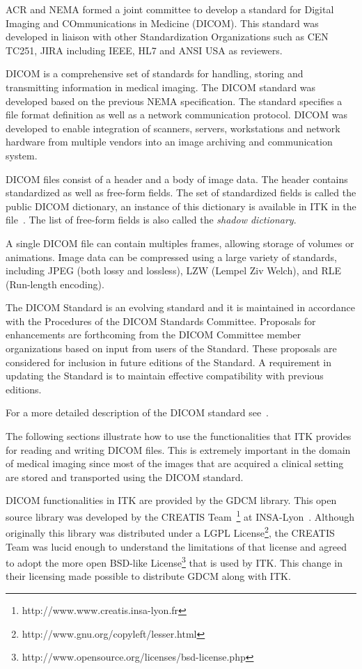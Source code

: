 ACR and NEMA formed a joint committee to develop a standard for Digital Imaging
and COmmunications in Medicine (DICOM).  This standard was developed in liaison
with other Standardization Organizations such as CEN TC251, JIRA including
IEEE, HL7 and ANSI USA as reviewers.

DICOM is a comprehensive set of standards for handling, storing and
transmitting information in medical imaging. The DICOM standard was developed
based on the previous NEMA specification.  The standard specifies a file format
definition as well as a network communication protocol. DICOM was developed to
enable integration of scanners, servers, workstations and network hardware from
multiple vendors into an image archiving and communication system.

DICOM files consist of a header and a body of image data. The header contains
standardized as well as free-form fields. The set of standardized fields is
called the public DICOM dictionary, an instance of this dictionary is available
in ITK in the file~.  The list of
free-form fields is also called the \emph{shadow dictionary}.

A single DICOM file can contain multiples frames, allowing storage of volumes
or animations. Image data can be compressed using a large variety of standards,
including JPEG (both lossy and lossless), LZW (Lempel Ziv Welch), and RLE
(Run-length encoding).

The DICOM Standard is an evolving standard and it is maintained in accordance
with the Procedures of the DICOM Standards Committee. Proposals for
enhancements are forthcoming from the DICOM Committee member organizations
based on input from users of the Standard. These proposals are considered for
inclusion in future editions of the Standard. A requirement in updating the
Standard is to maintain effective compatibility with previous editions.

For a more detailed description of the DICOM standard see~\cite{DICOMStandard}.

The following sections illustrate how to use the functionalities that ITK
provides for reading and writing DICOM files. This is extremely important in
the domain of medical imaging since most of the images that are acquired a
clinical setting are stored and transported using the DICOM standard.

DICOM functionalities in ITK are provided by the GDCM library. This open source
library was developed by the CREATIS
Team~\footnote{http://www.www.creatis.insa-lyon.fr} at
INSA-Lyon~\cite{CreatisINSA-Lyon}.  Although originally this library was
distributed under a LGPL
License\footnote{http://www.gnu.org/copyleft/lesser.html}, the CREATIS Team was
lucid enough to understand the limitations of that license and agreed to adopt
the more open BSD-like
License\footnote{http://www.opensource.org/licenses/bsd-license.php} that is
used by ITK. This change in their licensing made possible to distribute GDCM
along with ITK.

